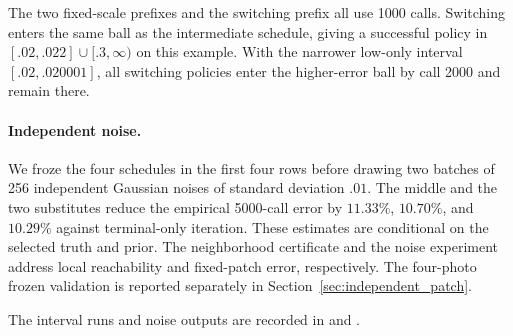 The two fixed-scale prefixes and the switching prefix all use 1000
calls. Switching enters the same ball as the intermediate schedule,
giving a successful policy in $[.02,.022]\cup[.3,\infty)$ on this
example. With the narrower low-only interval $[.02,.020001]$,
all switching policies enter the higher-error ball by call 2000
and remain there.

\paragraph{Independent noise.}
We froze the four schedules in the first four rows before drawing
two batches of 256 independent Gaussian noises of standard deviation
$.01$. The middle and the two substitutes reduce the empirical
5000-call error by $11.33\%$, $10.70\%$, and $10.29\%$ against
terminal-only iteration. These estimates are conditional on the
selected truth and prior. The neighborhood certificate and the
noise experiment address local reachability and fixed-patch error,
respectively. The four-photo frozen validation is reported separately
in Section~\ref{sec:independent_patch}.

The interval runs and noise outputs are recorded in
 and
.
